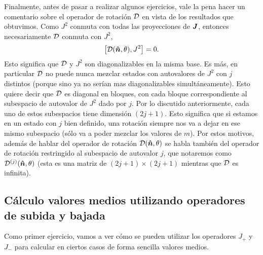 \documentclass[10pt, a4paper]{article}
\numberwithin{equation}{subsection}
\begin{document}
\bigbreak
Finalmente, antes de pasar a realizar algunos ejercicios, vale la pena hacer un
comentario sobre el operador de rotación $\RotationOp$ en vista de los
resultados que obtuvimos. Como $J^2$ conmuta con todas las proyecciones de
$\vb*{J}$, entonces necesariamente $\RotationOp$ conmuta con $J^2$,
\begin{equation}
  \comm{\RotationOp(\vers{n},\theta)}{J^2} = 0.
\end{equation}
Esto significa que $\RotationOp$ y $J^2$ son diagonalizables en la misma base.
Es más, en particular $\RotationOp$ no puede nunca mezclar estados con
autovalores de $J^2$ con $j$ distintos (porque sino ya no serían mas
diagonalizables simultáneamente). Esto quiere decir que $\RotationOp$ es
diagonal en bloques, con cada bloque correspondiente al subespacio de
autovalor de $J^2$ dado por $j$. Por lo discutido anteriormente, cada uno de
estos subespacios tiene dimensión $(2j+1)$. Esto significa que si estamos en un
estado con $j$ bien definido, una rotación siempre nos va a dejar en ese mismo
subespacio (sólo va a poder mezclar los valores de $m$). Por estos motivos,
además de hablar del operador de rotación $\RotationOp(\vers{n},\theta)$ se
habla también del operador de rotación restringido al subespacio de autovalor
$j$, que notaremos como $\RotationOp[j](\vers{n},\theta)$ (esta es una matriz
de $(2j+1)\times(2j+1)$ mientras que $\RotationOp$ es infinita).

\bigbreak
{}

\bigbreak
{}

\subsection{Cálculo valores medios utilizando operadores de subida y bajada}

Como primer ejercicio, vamos a ver cómo se pueden utilizar los operadores $J_+$
y $J_-$ para calcular en ciertos casos de forma sencilla valores medios.
\end{document}
